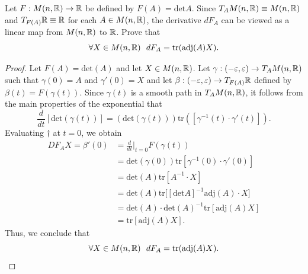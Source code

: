 \documentclass{article}
\begin{document}
\begin{problem}
    Let \( F: M(n,\mathbb{R}) \to \mathbb{R}  \) be defined by \( F(A) = \text{det} A  \). Since \( {T}_{A}M(n,\mathbb{R}) \equiv M(n,\mathbb{R}) \) and \( T_{F(A)} \mathbb{R} \equiv \mathbb{R}  \) for each \( A \in M(n,\mathbb{R}) \), the derivative \( d {F}_{A} \) can be viewed as a linear map from \( M(n,\mathbb{R})  \) to \( \mathbb{R}  \). Prove that 
    \[  \forall X \in M(n,\mathbb{R}) \ \ d {F}_{A} = \text{tr}(\text{adj}(A) X ).  \]
\end{problem}
\begin{proof}
Let \( F(A) = \text{det}(A)  \) and let \( X \in M(n,\mathbb{R}) \). Let \( \gamma:  (-\varepsilon, \varepsilon) \to {T}_{A}M(n,\mathbb{R}) \) such that \( \gamma(0) = A  \) and \( \gamma'(0) = X  \) and let \( \beta: (-\varepsilon, \varepsilon) \to {T}_{F(A)} \mathbb{R} \) defined by \( \beta(t) = F(\gamma(t)) \). Since \( \gamma(t) \) is a smooth path in \( {T}_{A}M(n,\mathbb{R}) \), it follows from the main properties of the exponential that 
\[  \frac{ d }{ dt } [\text{det}(\gamma(t))] = (\text{det}(\gamma(t))) \text{tr}([\gamma^{-1}(t) \cdot \gamma'(t)]). \tag{\( \dagger \)}\]
Evaluating \( \dagger \) at \( t = 0  \), we obtain
\begin{align*}
    D {F}_{A}X = \beta'(0) &= \frac{ d }{ dt } \Big|_{t = 0} F(\gamma(t)) \\
                           &= \text{det}(\gamma(0)) \text{tr}[\gamma^{-1}(0) \cdot \gamma'(0)] \\
                           &= \text{det}(A) \text{tr}[A^{-1} \cdot X] \\
                           &= \text{det}(A) \text{tr}\Big[ [\text{det} A]^{-1} \text{adj}(A) \cdot X  \Big] \\
                           &= \text{det}(A) \cdot \text{det}(A)^{-1} \text{tr}[\text{adj}(A) X  ] \\
                           &= \text{tr}[\text{adj}(A) X  ].
\end{align*}
Thus, we conclude that
    \[  \forall X \in M(n,\mathbb{R}) \ \ d {F}_{A} = \text{tr}(\text{adj}(A) X ).  \]
\end{proof}
\end{document}
